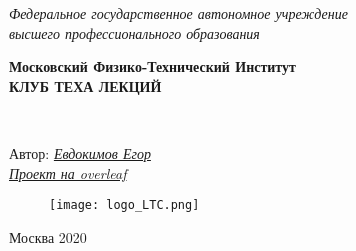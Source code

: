\begin{titlepage}
	\clearpage\thispagestyle{empty}
	\centering
	
	\textit{Федеральное государственное автономное учреждение \\
		высшего профессионального образования}
	\vspace{0.5ex}
	
	\textbf{Московский Физико-Технический Институт \\ КЛУБ ТЕХА ЛЕКЦИЙ}
	\vspace{20ex}
	\vspace{13ex}
	
	\\
	
	\vspace{1ex}
	Автор: \href{https://vk.com/ea_evdokimov}{\textit{Евдокимов Егор}}
	\\
	\href{https://www.overleaf.com/read/fypgwfhfjbpw}{\textit{Проект на overleaf}}
	\begin{figure}[!ht]
		\centering
		\texttt{[image: logo\_LTC.png]}
		\label{fig:my_label}
	\end{figure}

	\vfill
	Москва 2020 
	\pagebreak
	
\end{titlepage}
